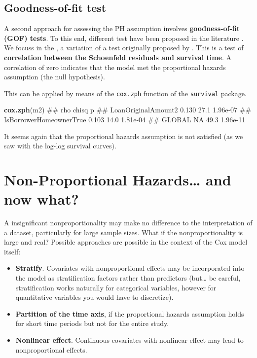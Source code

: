 \documentclass[]{book}
\makeatletter
\newenvironment{Shaded}{\begin{snugshade}}{\end{snugshade}}
\newcommand{\KeywordTok}[1]{\textcolor[rgb]{0.13,0.29,0.53}{\textbf{#1}}}
\newcommand{\NormalTok}[1]{#1}
\newenvironment{kframe}{%
\medskip{}
\setlength{\fboxsep}{.8em}
 \def\at@end@of@kframe{}%
 \ifinner\ifhmode%
  \def\at@end@of@kframe{\end{minipage}}%
  \begin{minipage}{\columnwidth}%
 \fi\fi%
 \def\FrameCommand##1{\hskip\@totalleftmargin \hskip-\fboxsep
 \colorbox{shadecolor}{##1}\hskip-\fboxsep
     \hskip-\linewidth \hskip-\@totalleftmargin \hskip\columnwidth}%
 \MakeFramed {\advance\hsize-\width
   \@totalleftmargin\z@ \linewidth\hsize
   \@setminipage}}%
 {\par\unskip\endMakeFramed%
 \at@end@of@kframe}
\renewenvironment{Shaded}{\begin{kframe}}{\end{kframe}}
\theoremstyle{definition}
\theoremstyle{definition}
\theoremstyle{definition}
\theoremstyle{remark}
\makeatother
\begin{document}
\subsection{Goodness-of-fit test}\label{goodness-of-fit-test}

A second approach for assessing the PH assumption involves
\textbf{goodness-of-fit (GOF) tests}. To this end, different test have
been proposed in the literature
\citep{1568a5d7e9974c31be97c0ff34c233a7}. We focuss in the
\citet{Harrell86}, a variation of a test originally proposed by
\citet{doi:10.1093/biomet/69.1.239}. This is a test of
\textbf{correlation between the Schoenfeld residuals and survival time}.
A correlation of zero indicates that the model met the proportional
hazards assumption (the null hypothesis).

This can be applied by means of the \texttt{cox.zph} function of the
\texttt{survival} package.

\begin{Shaded}
\begin{Highlighting}[]
\KeywordTok{cox.zph}\NormalTok{(m2)}
\NormalTok{##                           rho chisq        p}
\NormalTok{## LoanOriginalAmount2     0.130  27.1 1.96e-07}
\NormalTok{## IsBorrowerHomeownerTrue 0.103  14.0 1.81e-04}
\NormalTok{## GLOBAL                     NA  49.3 1.96e-11}
\end{Highlighting}
\end{Shaded}

It seems again that the proportional hazards assumption is not satisfied
(as we saw with the log-log survival curves).

\section{Non-Proportional Hazards\ldots{} and now
what?}\label{non-proportional-hazards-and-now-what}

A insignificant nonproportionality may make no difference to the
interpretation of a dataset, particularly for large sample sizes. What
if the nonproportionality is large and real? Possible approaches are
possible in the context of the Cox model itself:

\begin{itemize}
\item
  \textbf{Stratify}. Covariates with nonproportional effects may be
  incorporated into the model as stratification factors rather than
  predictors (but\ldots{} be careful, stratification works naturally for
  categorical variables, however for quantitative variables you would
  have to discretize).
\item
  \textbf{Partition of the time axis}, if the proportional hazards
  assumption holds for short time periods but not for the entire study.
\item
  \textbf{Nonlinear effect}. Continuous covariates with nonlinear effect
  may lead to nonproportional effects.
\end{itemize}
\end{document}

